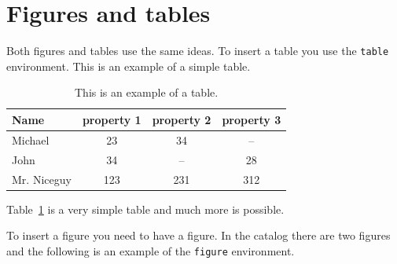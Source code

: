 \documentclass[english, twoside, 12pt, a4paper]{article}
\theoremstyle{definition}
\theoremstyle{plain}
\theoremstyle{remark}
\begin{document}
\clearpage
\section{Figures and tables}

Both figures and tables use the same ideas. To insert a table you use the \verb+table+ environment. This is an example of a simple table.

\begin{table}[hbt]
  \centering

  \captionsetup{margin=10pt,font=small,labelfont=bf,width=.8\textwidth}

  \caption[Short name for a table]{This is an example of a table.}
  \label{tab:exceptional-table}

\vspace*{2ex}

  \begin{tabular}{lccc}
    Name        & property 1 & property 2 & property 3 \\ \hline
    Michael     & 23         & 34         & --         \\
    John        & 34         & --         & 28         \\
    Mr. Niceguy & 123        & 231        & 312        \\ \hline
  \end{tabular}
\end{table}

Table~\ref{tab:exceptional-table} is a very simple table and much more is possible.

To insert a figure you need to have a figure. In the catalog there are two figures and the following is an example of the \verb+figure+ environment.
\end{document}

